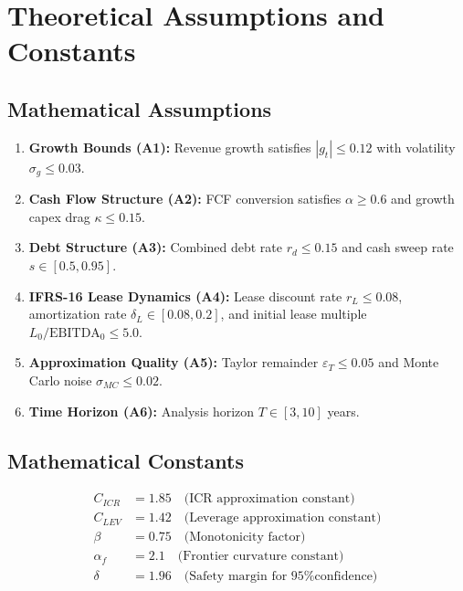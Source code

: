 
\section{Theoretical Assumptions and Constants}

\subsection{Mathematical Assumptions}

\begin{enumerate}
\item \textbf{Growth Bounds (A1):} Revenue growth satisfies $|g_t| \leq 0.12$ with volatility $\sigma_g \leq 0.03$.

\item \textbf{Cash Flow Structure (A2):} FCF conversion satisfies $\alpha \geq 0.6$ and growth capex drag $\kappa \leq 0.15$.

\item \textbf{Debt Structure (A3):} Combined debt rate $r_d \leq 0.15$ and cash sweep rate $s \in [0.5, 0.95]$.

\item \textbf{IFRS-16 Lease Dynamics (A4):} Lease discount rate $r_L \leq 0.08$, amortization rate $\delta_L \in [0.08, 0.2]$, and initial lease multiple $L_0/\text{EBITDA}_0 \leq 5.0$.

\item \textbf{Approximation Quality (A5):} Taylor remainder $\varepsilon_T \leq 0.05$ and Monte Carlo noise $\sigma_{MC} \leq 0.02$.

\item \textbf{Time Horizon (A6):} Analysis horizon $T \in [3, 10]$ years.
\end{enumerate}

\subsection{Mathematical Constants}

\begin{align}
C_{ICR} &= 1.85 \quad \text{(ICR approximation constant)} \\
C_{LEV} &= 1.42 \quad \text{(Leverage approximation constant)} \\
\beta &= 0.75 \quad \text{(Monotonicity factor)} \\
\alpha_f &= 2.1 \quad \text{(Frontier curvature constant)} \\
\delta &= 1.96 \quad \text{(Safety margin for 95\% confidence)}
\end{align}
